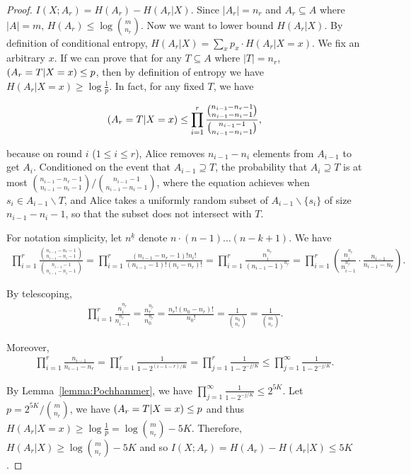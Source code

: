 \documentclass[10pt]{article}
\let\Pr\relax
\DeclareMathOperator*{\Pr}{\mathbb{P}}
\begin{document}
\begin{proof}
  $I(X;A_r)=H(A_r)-H(A_r|X)$. Since $|A_r|=n_r$ and $A_r\subseteq A$ where $|A|=m$, $H(A_r)\le \log {m \choose n_r}$. Now we want to lower bound $H(A_r|X)$. By definition of conditional entropy, $H(A_r|X)=\sum_x{p_x\cdot H(A_r|X=x)}$. We fix an arbitrary $x$. If we can prove that for any $T\subseteq A$ where $|T|=n_r$, $\Pr(A_r=T|X=x)\le p$, then by definition of entropy we have $H(A_r|X=x)\ge\log\frac{1}{p}$. In fact, for any fixed $T$, we have
  
  \begin{align}
    \Pr(A_r=T|X=x)\le \prod_{i=1}^{r}{\frac{{n_{i-1}-n_r-1 \choose n_{i-1}-n_i-1}}{{n_{i-1}-1 \choose n_{i-1}-n_i-1}}},
  \end{align}
  
  because on round $i$ ($1\le i \le r$), Alice removes $n_{i-1}-n_i$ elements from $A_{i-1}$ to get $A_i$. Conditioned on the event that $A_{i-1}\supseteq T$, the probability that $A_i\supseteq T$ is at most ${{n_{i-1}-n_r-1 \choose n_{i-1}-n_i-1}}/{{n_{i-1}-1 \choose n_{i-1}-n_i-1}}$, where the equation achieves when $s_i\in A_{i-1}\backslash T$, and Alice takes a uniformly random subset of $A_{i-1}\backslash \{s_i\}$ of size $n_{i-1}-n_i-1$, so that the subset does not intersect with $T$.
  
  For notation simplicity, let $n^{\underline{k}}$ denote $n\cdot (n-1)\ldots (n-k+1)$. We have 
  \begin{align}
    \prod_{i=1}^{r}{\frac{{n_{i-1}-n_r-1 \choose n_{i-1}-n_i-1}}{{n_{i-1}-1 \choose n_{i-1}-n_i-1}}}
    =\prod_{i=1}^{r}\frac{(n_{i-1}-n_r-1)!n_i!}{(n_{i-1}-1)!(n_i-n_r)!}
    =\prod_{i=1}^{r}\frac{n_i^{\underline{n_r}}}{(n_{i-1}-1)^{\underline{n_r}}}
    =\prod_{i=1}^{r} \left( \frac{n_i^{\underline{n_r}}}{n_{i-1}^{\underline{n_r}}}\cdot \frac{n_{i-1}}{n_{i-1}-n_r} \right).
  \end{align}
  
  By telescoping,
  \begin{align}
    \prod_{i=1}^{r} \frac{n_i^{\underline{n_r}}}{n_{i-1}^{\underline{n_r}}}
    =\frac{n_r^{\underline{n_r}}}{n_0^{\underline{n_r}}}
    =\frac{n_r!(n_0-n_r)!}{n_0!}=\frac{1}{{n_0 \choose n_r}}
    =\frac{1}{{m \choose n_r}}.
  \end{align}
  
  Moreover, 
  \begin{align}
    \prod_{i=1}^{r} \frac{n_{i-1}}{n_{i-1}-n_r}
    =\prod_{i=1}^{r} \frac{1}{1-2^{(i-1-r)/K}}
    =\prod_{j=1}^{r} \frac{1}{1-2^{-j/K}}
    \le \prod_{j=1}^{\infty} \frac{1}{1-2^{-j/K}}.
  \end{align}
  
  By Lemma~\ref{lemma:Pochhammer}, we have $\prod_{j=1}^{\infty} \frac{1}{1-2^{-j/K}}\le 2^{5K}$. Let $p={2^{5K}}/{{m\choose n_r}}$, we have $\Pr(A_r=T|X=x)\le p$ and thus $H(A_r|X=x)\ge \log\frac{1}{p}=\log{{m\choose n_r}}-5K$. Therefore, $H(A_r|X)\ge \log{{m\choose n_r}}-5K$ and so $I(X;A_r)=H(A_r)-H(A_r|X)\le 5K$.  
\end{proof}
\end{document}
